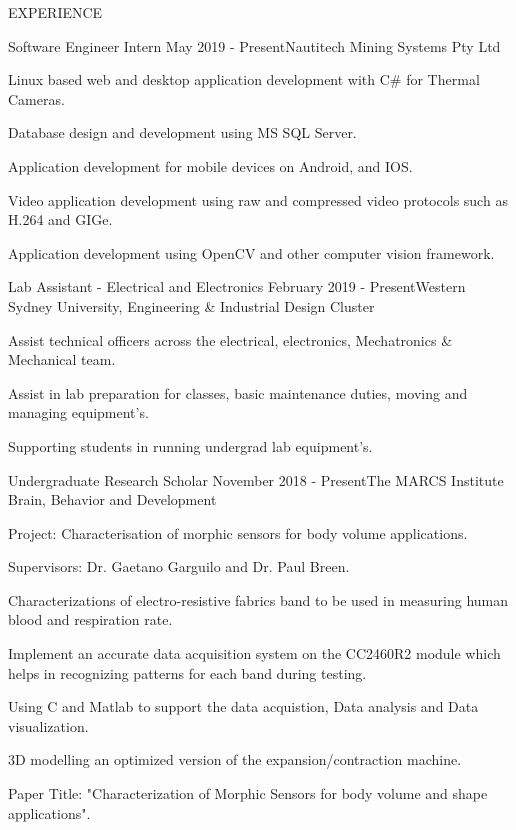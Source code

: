 \documentclass{resume} %
\begin{document}
\begin{rSection}{EXPERIENCE}

\begin{rSubsection}{Software Engineer Intern} {May 2019 - Present}{\faInstitution Nautitech Mining Systems Pty Ltd}{}
\item Linux based web and desktop application development with C\# for Thermal Cameras.
\item Database design and development using MS SQL Server.
\item Application development for mobile devices on Android, and IOS.
\item Video application development using raw and compressed video protocols such as H.264 and GIGe.
\item Application development using OpenCV and other computer vision framework.

\end{rSubsection}

\begin{rSubsection}{Lab Assistant - Electrical and Electronics} {February 2019 - Present}{\faInstitution Western Sydney University, Engineering \& Industrial Design Cluster}{}
\item Assist technical officers across the electrical, electronics, Mechatronics \& Mechanical team.
\item Assist in lab preparation for classes, basic maintenance duties, moving and managing equipment's.
\item Supporting students in running undergrad lab equipment's.
\end{rSubsection}

\begin{rSubsection}{Undergraduate Research Scholar} {November 2018 - Present}{\faInstitution The MARCS Institute Brain, Behavior and Development}{}
\item Project: Characterisation of morphic sensors for body volume applications.
\item Supervisors: Dr. Gaetano Garguilo and Dr. Paul Breen.
\item Characterizations of electro-resistive fabrics band to be used in measuring human blood and respiration rate.
\item Implement an accurate data acquisition system on the CC2460R2 module which helps in recognizing patterns for each band during testing. 
\item Using C and Matlab to support the data acquistion, Data analysis and Data visualization.
\item 3D modelling an optimized version of the expansion/contraction machine.
\item Paper Title: "Characterization of Morphic Sensors for body volume and shape applications".
\end{rSubsection}


\end{rSection}
\end{document}
